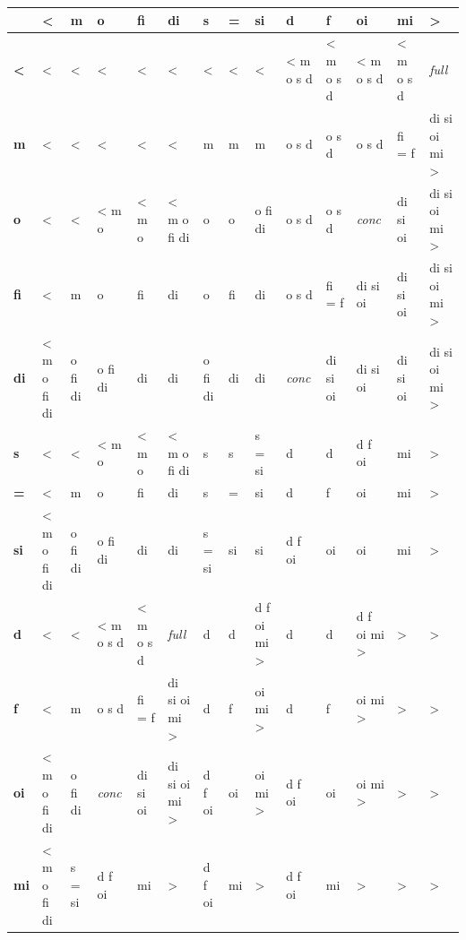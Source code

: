\documentclass[11pt]{article}
\begin{document}
\begin{table}[t]
\centering
\scriptsize
\setlength{\tabcolsep}{1.6pt}
\renewcommand{\arraystretch}{1.25}
\begin{tabular}{>{\rmfamily\bfseries}l *{13}{>{\ttfamily\centering\arraybackslash}p{}}}
\toprule
& \textrm{\textbf{{<}}} & \textrm{\textbf{m}} & \textrm{\textbf{o}} & \textrm{\textbf{fi}} & \textrm{\textbf{di}} & \textrm{\textbf{s}} & \textrm{\textbf{=}} & \textrm{\textbf{si}} & \textrm{\textbf{d}} & \textrm{\textbf{f}} & \textrm{\textbf{oi}} & \textrm{\textbf{mi}} & \textrm{\textbf{{>}}} \\ \midrule
\rowcolor{panel} \textbf{{<}} & {<} & {<} & {<} & {<} & {<} & {<} & {<} & {<} & {<} m o s d & {<} m o s d & {<} m o s d & {<} m o s d & \textit{full} \\
\textbf{m} & {<} & {<} & {<} & {<} & {<} & m & m & m & o s d & o s d & o s d & fi = f & di si oi mi {>} \\
\rowcolor{panel} \textbf{o} & {<} & {<} & {<} m o & {<} m o & {<} m o fi di & o & o & o fi di & o s d & o s d & \textit{conc} & di si oi & di si oi mi {>} \\
\textbf{fi} & {<} & m & o & fi & di & o & fi & di & o s d & fi = f & di si oi & di si oi & di si oi mi {>} \\
\rowcolor{panel} \textbf{di} & {<} m o fi di & o fi di & o fi di & di & di & o fi di & di & di & \textit{conc} & di si oi & di si oi & di si oi & di si oi mi {>} \\
\textbf{s} & {<} & {<} & {<} m o & {<} m o & {<} m o fi di & s & s & s = si & d & d & d f oi & mi & {>} \\
\rowcolor{panel} \textbf{=} & {<} & m & o & fi & di & s & = & si & d & f & oi & mi & {>} \\
\textbf{si} & {<} m o fi di & o fi di & o fi di & di & di & s = si & si & si & d f oi & oi & oi & mi & {>} \\
\rowcolor{panel} \textbf{d} & {<} & {<} & {<} m o s d & {<} m o s d & \textit{full} & d & d & d f oi mi {>} & d & d & d f oi mi {>} & {>} & {>} \\
\textbf{f} & {<} & m & o s d & fi = f & di si oi mi {>} & d & f & oi mi {>} & d & f & oi mi {>} & {>} & {>} \\
\rowcolor{panel} \textbf{oi} & {<} m o fi di & o fi di & \textit{conc} & di si oi & di si oi mi {>} & d f oi & oi & oi mi {>} & d f oi & oi & oi mi {>} & {>} & {>} \\
\textbf{mi} & {<} m o fi di & s = si & d f oi & mi & {>} & d f oi & mi & {>} & d f oi & mi & {>} & {>} & {>} \\

\end{tabular}
\end{table}
\end{document}

